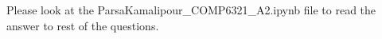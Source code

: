 \documentclass[10pt,letter,notitlepage]{article}
\begin{document}



\begin{Answer}

	Please look at the ParsaKamalipour\_COMP6321\_A2.ipynb file to read the answer to rest of the questions.

\end{Answer}



\vspace{+0.5cm}


\end{document}
